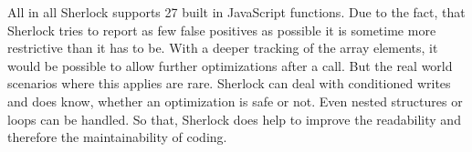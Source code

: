 All in all Sherlock supports 27 built in JavaScript functions. Due to the fact, that
 Sherlock tries to report as few false positives as possible it is sometime more 
 restrictive than it has to be. With a deeper tracking of the array elements, it 
 would be possible to allow further optimizations after a 
 call. But the real world scenarios where this applies are rare. Sherlock can deal 
 with conditioned writes and does know, whether an optimization is safe or not. Even
 nested structures or loops can be handled. So that, Sherlock does help to improve 
 the readability and therefore the maintainability of coding.










